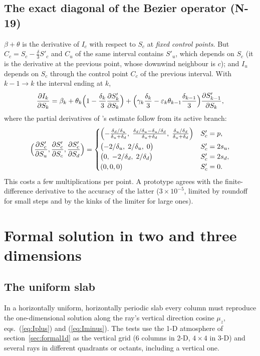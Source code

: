 \documentclass[11pt,a4paper]{article}
\begin{document}
\subsection{The exact diagonal of the Bezier operator (N-19)}
\label{sec:psi}
$\beta+\theta$ is the derivative of $I_c$ with respect to $S_c$ at
\emph{fixed control points}. But $C_c = S_c-\tfrac\delta3S'_c$ and
$C_u$ of the same interval contains $S'_u$, which depends on $S_c$ (it
is the derivative at the previous point, whose downwind neighbour is
$c$); and $I_u$ depends on $S_c$ through the control point $C_c$ of the
previous interval. With $k-1\to k$ the interval ending at $k$,
\begin{equation}
\frac{\partial I_k}{\partial S_k} =
\beta_k + \theta_k\Bigl(1-\frac{\delta_k}{3}\frac{\partial S'_k}{\partial S_k}\Bigr)
+ \Bigl(\gamma_k\frac{\delta_k}{3} - \varepsilon_k\theta_{k-1}\frac{\delta_{k-1}}{3}\Bigr)
  \frac{\partial S'_{k-1}}{\partial S_k},
\end{equation}
where the partial derivatives of \citeauthor{1990A&A...239..443S}'s estimate follow from its
active branch:
\begin{equation}
\Bigl(\frac{\partial S'_c}{\partial S_u},\frac{\partial S'_c}{\partial S_c},
\frac{\partial S'_c}{\partial S_d}\Bigr) =
\begin{cases}
\Bigl(-\frac{\delta_d/\delta_u}{\delta_u+\delta_d},\;
\frac{\delta_d/\delta_u-\delta_u/\delta_d}{\delta_u+\delta_d},\;
\frac{\delta_u/\delta_d}{\delta_u+\delta_d}\Bigr) & S'_c = p,\\[1ex]
\bigl(-2/\delta_u,\;2/\delta_u,\;0\bigr) & S'_c = 2s_u,\\
\bigl(0,\;-2/\delta_d,\;2/\delta_d\bigr) & S'_c = 2s_d,\\
(0,0,0) & S'_c = 0.
\end{cases}
\end{equation}
This costs a few multiplications per point. A prototype agrees with the
finite-difference derivative to the accuracy of the latter
($3\times10^{-5}$, limited by roundoff for small steps and by the kinks
of the limiter for large ones).

\section{Formal solution in two and three dimensions}

\subsection{The uniform slab}
In a horizontally uniform, horizontally periodic slab every column must
reproduce the one-dimensional solution along the ray's vertical
direction cosine $\mu_z$, eqs.~(\ref{eq:Iplus}) and (\ref{eq:Iminus}).
The tests use the 1-D atmosphere of section~\ref{sec:formal1d} as the
vertical grid ($6$ columns in 2-D, $4\times4$ in 3-D) and several rays
in different quadrants or octants, including a vertical one.
\end{document}

